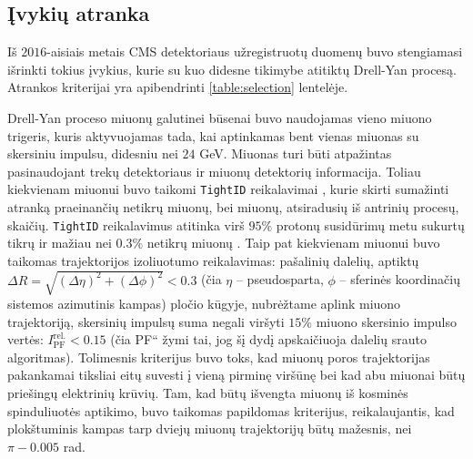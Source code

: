 \documentclass[a4paper, 12pt, oneside]{article}
\newcommand{\ttt}[1]{\texttt{#1}}
\newcommand{\ltq}[1]{{\quotedblbase{}#1\textquotedblleft{}}}
\newlength\q
\begin{document}
\subsection{Įvykių atranka}\label{sec:selection}
Iš $2016$-aisiais metais CMS detektoriaus užregistruotų duomenų buvo stengiamasi išrinkti tokius įvykius, kurie
su kuo didesne tikimybe atitiktų Drell-Yan procesą.
Atrankos kriterijai yra apibendrinti \ref{table:selection} lentelėje.

Drell-Yan proceso miuonų galutinei būsenai buvo naudojamas vieno miuono trigeris, kuris aktyvuojamas tada,
kai aptinkamas bent vienas miuonas su skersiniu impulsu, didesniu nei $24$ GeV.
Miuonas turi būti atpažintas pasinaudojant trekų detektoriaus ir miuonų detektorių informacija.
Toliau kiekvienam miuonui buvo taikomi \ttt{TightID} reikalavimai \cite{MuonID}, kurie skirti sumažinti atranką
praeinančių netikrų miuonų, bei miuonų, atsiradusių iš antrinių procesų, skaičių.
\ttt{TightID} reikalavimus atitinka virš $95\%$ protonų susidūrimų metu sukurtų tikrų ir mažiau nei $0.3\%$ netikrų
miuonų \cite{MuonID}.
Taip pat kiekvienam miuonui buvo taikomas trajektorijos izoliuotumo reikalavimas: pašalinių dalelių, aptiktų
$\Delta R = \sqrt{(\Delta\eta)^2 + (\Delta\phi)^2} < 0.3$ (čia $\eta$ -- pseudosparta, $\phi$ -- sferinės koordinačių
sistemos azimutinis kampas) pločio kūgyje, nubrėžtame aplink miuono trajektoriją, skersinių impulsų suma negali
viršyti $15\%$ miuono skersinio impulso vertės: $I_{\mathrm{PF}}^{\mathrm{rel.}}<0.15$ (čia \ltq{PF} žymi tai, jog
šį dydį apskaičiuoja dalelių srauto algoritmas).
Tolimesnis kriterijus buvo toks, kad miuonų poros trajektorijas pakankamai tiksliai eitų suvesti į vieną pirminę
viršūnę bei kad abu miuonai būtų priešingų elektrinių krūvių.
Tam, kad būtų išvengta miuonų iš kosminės spinduliuotės aptikimo, buvo taikomas papildomas kriterijus, reikalaujantis,
kad plokštuminis kampas tarp dviejų miuonų trajektorijų būtų mažesnis, nei $\pi-0.005$ rad.
\end{document}
